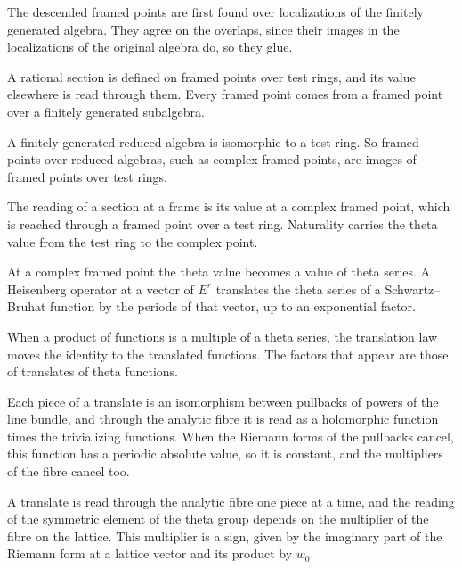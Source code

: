 The descended framed points are first found over localizations of the finitely generated algebra. They agree on the
overlaps, since their images in the localizations of the original algebra do, so they glue.

A rational section is defined on framed points over test rings, and its value elsewhere is read through them. Every
framed point comes from a framed point over a finitely generated subalgebra.

A finitely generated reduced algebra is isomorphic to a test ring. So framed points over reduced algebras, such as
complex framed points, are images of framed points over test rings.

The reading of a section at a frame is its value at a complex framed point, which is reached through a framed point
over a test ring. Naturality carries the theta value from the test ring to the complex point.

At a complex framed point the theta value becomes a value of theta series. A Heisenberg operator at a vector of
$E^r$ translates the theta series of a Schwartz--Bruhat function by the periods of that vector, up to an exponential
factor.

When a product of functions is a multiple of a theta series, the translation law moves the identity to the
translated functions. The factors that appear are those of translates of theta functions.

Each piece of a translate is an isomorphism between pullbacks of powers of the line bundle, and through the analytic
fibre it is read as a holomorphic function times the trivializing functions. When the Riemann forms of the pullbacks
cancel, this function has a periodic absolute value, so it is constant, and the multipliers of the fibre cancel too.

A translate is read through the analytic fibre one piece at a time, and the reading of the symmetric element of the
theta group depends on the multiplier of the fibre on the lattice. This multiplier is a sign, given by the imaginary
part of the Riemann form at a lattice vector and its product by $w_0$.

